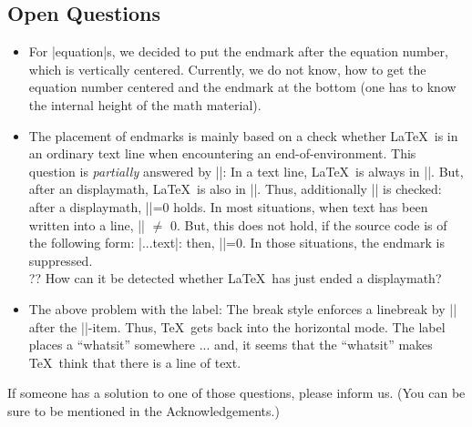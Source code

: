 \subsection{Open Questions}
\begin{itemize}
\item
For |equation|s, we decided to put the endmark after the equation
number, which is vertically centered.
Currently, we do not know, how to get the equation number centered and
the endmark at the bottom (one has to know the internal height of the
math material).
\item
The placement of endmarks is mainly based on a check whether \LaTeX\
is in an ordinary text line when encountering an end-of-environment.
This question is \emph{partially} answered by |\ifhmode|: In a text
line, \LaTeX\ is always in |\hmode|. 
But, after an displaymath, \LaTeX\ is also in |\hmode|. Thus,
additionally |\lastskip| is checked: after a displaymath, 
|\lastskip|=0 holds.
In most situations, when text has been written into a line, 
|\lastskip| $\neq$ 0. But, this does not hold, if the source code
is of the following form: |...text\label{bla}|: then, |\lastskip|=0.
In those situations, the endmark is suppressed. \\
?? How can it be detected whether \LaTeX\ has just ended a displaymath?
\item 
The above problem with the label: The break style enforces a linebreak
by |\hfill\penalty-8000| after the |\trivlist|-item. Thus, \TeX\
gets back into the horizontal mode. The label places a ``whatsit''
somewhere ... and, it seems that the ``whatsit'' makes \TeX\ think
that there is a line of text. 
\end{itemize}
If someone has a solution to one of those questions, please inform us.
(You can be sure to be mentioned in the Acknowledgements.)

\endinput
